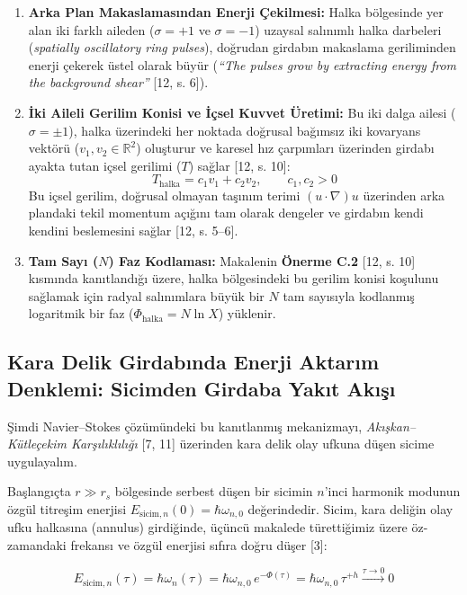 \documentclass[12pt,a4paper]{article}
\begin{document}
\begin{enumerate}
    \item \textbf{Arka Plan Makaslamasından Enerji Çekilmesi:} Halka bölgesinde yer alan iki farklı aileden ($\sigma = +1$ ve $\sigma = -1$) uzaysal salınımlı halka darbeleri (\textit{spatially oscillatory ring pulses}), doğrudan girdabın makaslama geriliminden enerji çekerek üstel olarak büyür (\textit{``The pulses grow by extracting energy from the background shear''} [12, s. 6]).
    \item \textbf{İki Aileli Gerilim Konisi ve İçsel Kuvvet Üretimi:} Bu iki dalga ailesi ($\sigma = \pm 1$), halka üzerindeki her noktada doğrusal bağımsız iki kovaryans vektörü ($v_1, v_2 \in \mathbb{R}^2$) oluşturur ve karesel hız çarpımları üzerinden girdabı ayakta tutan içsel gerilimi ($T$) sağlar [12, s. 10]:
    \begin{equation}
    T_{\text{halka}} = c_1 v_1 + c_2 v_2, \qquad c_1, c_2 > 0
    \end{equation}
    Bu içsel gerilim, doğrusal olmayan taşınım terimi $(u \cdot \nabla)u$ üzerinden arka plandaki tekil momentum açığını tam olarak dengeler ve girdabın kendi kendini beslemesini sağlar [12, s. 5--6].
    \item \textbf{Tam Sayı ($N$) Faz Kodlaması:} Makalenin \textbf{Önerme C.2} [12, s. 10] kısmında kanıtlandığı üzere, halka bölgesindeki bu gerilim konisi koşulunu sağlamak için radyal salınımlara büyük bir $N$ tam sayısıyla kodlanmış logaritmik bir faz ($\Phi_{\text{halka}} = N \ln X$) yüklenir.
\end{enumerate}

\subsection{Kara Delik Girdabında Enerji Aktarım Denklemi: Sicimden Girdaba Yakıt Akışı}

Şimdi Navier--Stokes çözümündeki bu kanıtlanmış mekanizmayı, \textit{Akışkan--Kütleçekim Karşılıklılığı} [7, 11] üzerinden kara delik olay ufkuna düşen sicime uygulayalım.

Başlangıçta $r \gg r_s$ bölgesinde serbest düşen bir sicimin $n$'inci harmonik modunun özgül titreşim enerjisi $E_{\text{sicim}, n}(0) = \hbar \omega_{n,0}$ değerindedir. Sicim, kara deliğin olay ufku halkasına (annulus) girdiğinde, üçüncü makalede türettiğimiz üzere öz-zamandaki frekansı ve özgül enerjisi sıfıra doğru düşer [3]:

\begin{equation}
E_{\text{sicim}, n}(\tau) = \hbar \omega_n(\tau) = \hbar \omega_{n,0} \, e^{-\Phi(\tau)} = \hbar \omega_{n,0} \, \tau^{+h} \xrightarrow{\tau \to 0} 0
\end{equation}
\end{document}
